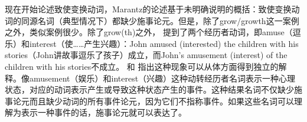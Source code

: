 \begin{exe}
\begin{xlist}[iv.]
\begin{exe}
\begin{xlist}[iv.]
现在开始论述致使变换动词，Marantz的论述基于未明确说明的概括：致使变换动词的同源名词（典型情况下）都缺少施事论元。但是，除了grow/growth这一案例之外，类似案例很少。除了grow(th)之外， \citet[例（7c）和（8c）]{Chomsky70a}提到了两个经历者动词，即amuse（逗乐）和interest（使……产生兴趣）：John amused (interested) the children with his stories（John讲故事逗乐了孩子）成立，而John's amusement (interest) of the children with his stories不成立。 \citet{Rappaport83a-u}和 \citet{Dowty89b-u}指出这种现象可以从体方面得到独立的解释。像amusement（娱乐）和interest（兴趣）这种动转经历者名词表示一种心理状态，对应的动词表示产生或导致这种状态产生的事件。这种结果名词不仅缺少施事论元而且缺少动词的所有事件论元，因为它们不指称事件。如果这些名词可以理解为表示一种事件的话，施事论元就可以表达了。


\end{xlist}
\end{exe}
\end{xlist}
\end{exe}
